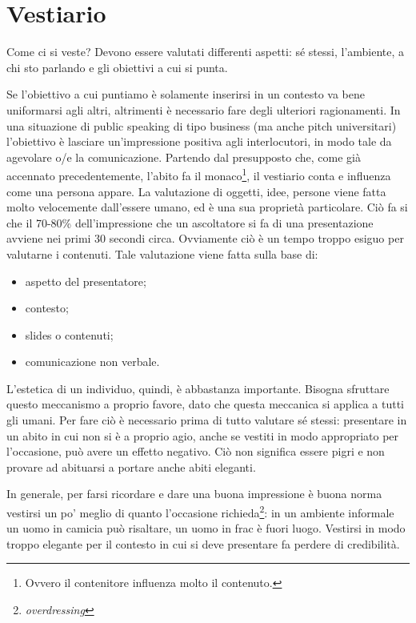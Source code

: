 \section{Vestiario}

Come ci si veste? Devono essere valutati differenti aspetti: sé stessi,
l'ambiente, a chi sto parlando e gli obiettivi a cui si punta.

Se l'obiettivo a cui puntiamo è solamente inserirsi in un contesto va bene
uniformarsi agli altri, altrimenti è necessario fare degli ulteriori
ragionamenti. In una situazione di public speaking di tipo business (ma anche
pitch universitari) l'obiettivo è lasciare un'impressione positiva agli
interlocutori, in modo tale da agevolare o/e la comunicazione. Partendo
dal presupposto che, come già accennato precedentemente, l'abito fa il
monaco\footnote{Ovvero il contenitore influenza molto il contenuto.}, il
vestiario conta e influenza come una persona appare. La valutazione di oggetti,
idee, persone viene fatta molto velocemente dall'essere umano, ed è una sua
proprietà particolare. Ciò fa si che il 70-80\% dell'impressione che
un ascoltatore si fa di una presentazione avviene nei primi 30 secondi circa.
Ovviamente ciò è un tempo troppo esiguo per valutarne i contenuti. Tale
valutazione viene fatta sulla base di:
\begin{itemize}
\item aspetto del presentatore;
\item contesto;
\item slides o contenuti;
\item comunicazione non verbale.
\end{itemize}

L'estetica di un individuo, quindi, è abbastanza importante. Bisogna sfruttare
questo meccanismo a proprio favore, dato che questa meccanica si applica a tutti
gli umani. Per fare ciò è necessario prima di tutto valutare sé stessi:
presentare in un abito in cui non si è a proprio agio, anche se vestiti in modo
appropriato per l'occasione, può avere un effetto negativo. Ciò non significa
essere pigri e non provare ad abituarsi a portare anche abiti eleganti.

In generale, per farsi ricordare e dare una buona impressione è buona norma
vestirsi un po' meglio di quanto l'occasione
richieda\footnote{\textit{overdressing}}: in un ambiente informale un uomo in
camicia può risaltare, un uomo in frac è fuori luogo. Vestirsi in modo troppo
elegante per il contesto in cui si deve presentare fa perdere di credibilità.

